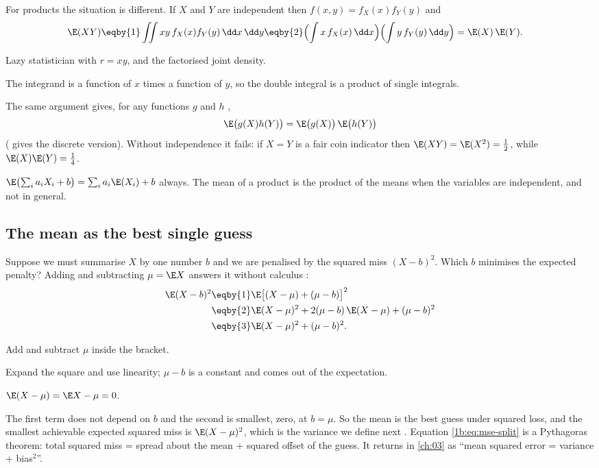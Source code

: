 For products the situation is different. If $X$ and $Y$ are independent then
$f(x,y)=f_X(x)f_Y(y)$ and 
\begin{align}
  \E(XY)
  &\eqby{1} \iint xy\,f_X(x)f_Y(y)\,\dd x\,\dd y
   \eqby{2} \Bigl(\int x\,f_X(x)\,\dd x\Bigr)\Bigl(\int y\,f_Y(y)\,\dd y\Bigr)
   = \E(X)\,\E(Y) .
  \label{1b:eq:product-mean}
\end{align}
\begin{explain}
  \item Lazy statistician with $r=xy$, and the factorised joint density.
  \item The integrand is a function of $x$ times a function of $y$, so the
        double integral is a product of single integrals.
\end{explain}
The same argument gives, for any functions $g$ and $h$
,
\[
  \E\bigl(g(X)h(Y)\bigr)=\E\bigl(g(X)\bigr)\,\E\bigl(h(Y)\bigr)
\]
( gives the discrete version). Without
independence it fails: if $X=Y$ is a fair coin indicator then
$\E(XY)=\E(X^2)=\tfrac12$, while $\E(X)\E(Y)=\tfrac14$.

\begin{keyidea}
$\E\bigl(\sum_ia_iX_i+b\bigr)=\sum_ia_i\E(X_i)+b$ always. The mean of a
product is the product of the means when the variables are independent, and
not in general.
\end{keyidea}

\subsection{The mean as the best single guess}

Suppose we must summarise $X$ by one number $b$ and we are penalised by the
squared miss $(X-b)^2$. Which $b$ minimises the expected penalty?
Adding and subtracting $\mu=\E X$ answers it without calculus
:
\begin{align}
  \E(X-b)^2
  &\eqby{1} \E\bigl[(X-\mu)+(\mu-b)\bigr]^2 \nonumber\\
  &\eqby{2} \E(X-\mu)^2+2(\mu-b)\,\E(X-\mu)+(\mu-b)^2 \nonumber\\
  &\eqby{3} \E(X-\mu)^2+(\mu-b)^2 .
  \label{1b:eq:mse-split}
\end{align}
\begin{explain}
  \item Add and subtract $\mu$ inside the bracket.
  \item Expand the square and use linearity; $\mu-b$ is a constant and comes
        out of the expectation.
  \item $\E(X-\mu)=\E X-\mu=0$.
\end{explain}
The first term does not depend on $b$ and the second is smallest, zero, at
$b=\mu$. So the mean is the best guess under squared loss, and the smallest
achievable expected squared miss is $\E(X-\mu)^2$, which is the variance we
define next . Equation \eqref{1b:eq:mse-split} is a
Pythagoras theorem: total squared miss = spread about the mean + squared
offset of the guess. It returns in \cref{ch:03} as ``mean squared error =
variance + bias$^2$''.

